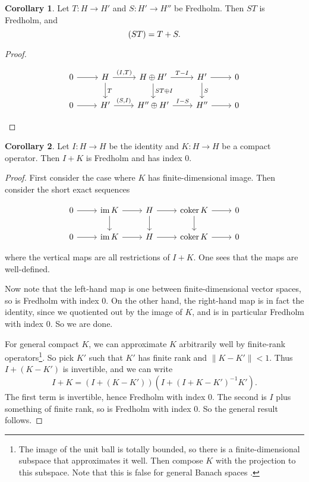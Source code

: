 \documentclass{shortart}
\theoremstyle{definition}
\newtheorem*{cor}{Corollary}
\let\index\relax
\DeclareMathOperator{\index}{idx}
\DeclareMathOperator{\coker}{coker}
\DeclareMathOperator{\im}{im}
\newcommand\id{I}
\begin{document}
\begin{cor}
  Let $T: H \to H'$ and $S : H' \to H''$ be Fredholm. Then $ST$ is Fredholm, and
  \[
    \index (ST) = \index T + \index S.
  \]
\end{cor}

\begin{proof}
  \begin{useimager}
    \[
      \begin{tikzcd}
        0 \ar[r] & H \ar[r, "{(\id, T)}"] \ar[d, "T"] & H \oplus H' \ar[r, "T - \id"] \ar[d, "ST \oplus \id"]& H' \ar[r] \ar[d, "S"] & 0\\
        0 \ar[r] & H' \ar[r, "{(S, \id)}"] & H'' \oplus H' \ar[r, "\id - S"] & H'' \ar[r] & 0
      \end{tikzcd}\qedshift
    \]
  \end{useimager}
\end{proof}

\begin{cor}
  Let $\id: H \to H$ be the identity and $K : H \to H$ be a compact operator. Then $\id + K$ is Fredholm and has index $0$.
\end{cor}

\begin{proof}
  First consider the case where $K$ has finite-dimensional image. Then consider the short exact sequences
  \begin{useimager}
    \[
      \begin{tikzcd}
        0 \ar[r] & \im K \ar[r] \ar[d] & H \ar[r] \ar[d]& \coker K \ar[r] \ar[d] & 0\\
        0 \ar[r] & \im K \ar[r] & H \ar[r] & \coker K \ar[r] & 0
      \end{tikzcd}
    \]
  \end{useimager}
  where the vertical maps are all restrictions of $\id + K$. One sees that the maps are well-defined.

  Now note that the left-hand map is one between finite-dimensional vector spaces, so is Fredholm with index $0$. On the other hand, the right-hand map is in fact the identity, since we quotiented out by the image of $K$, and is in particular Fredholm with index $0$. So we are done.

  For general compact $K$, we can approximate $K$ arbitrarily well by finite-rank operators\footnote{The image of the unit ball is totally bounded, so there is a finite-dimensional subspace that approximates it well. Then compose $K$ with the projection to this subspace. Note that this is false for general Banach spaces \cite{enflo1973}.}. So pick $K'$ such that $K'$ has finite rank and $\|K - K'\| < 1$. Thus $\id + (K - K')$ is invertible, and we can write
  \[
    \id + K = (\id + (K - K')) (\id + (\id + K - K')^{-1} K').
  \]
  The first term is invertible, hence Fredholm with index $0$. The second is $\id$ plus something of finite rank, so is Fredholm with index $0$. So the general result follows.
\end{proof}
\end{document}

